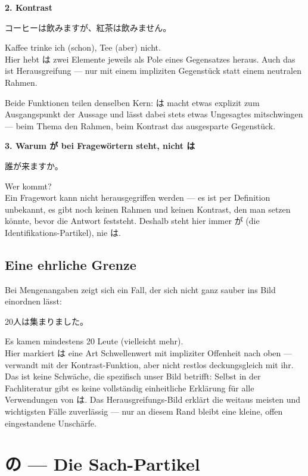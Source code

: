 \documentclass[12pt]{book}
\begin{document}
\textbf{2. Kontrast}
\par\quad コーヒーは飲みますが、紅茶は飲みません。\\
\par\quad Kaffee trinke ich (schon), Tee (aber) nicht.\\

Hier hebt は zwei Elemente jeweils als Pole eines Gegensatzes heraus. Auch das ist Herausgreifung — nur mit einem impliziten Gegenstück statt einem neutralen Rahmen.

Beide Funktionen teilen denselben Kern: は macht etwas explizit zum Ausgangspunkt der Aussage und lässt dabei stets etwas Ungesagtes mitschwingen — beim Thema den Rahmen, beim Kontrast das ausgesparte Gegenstück.

\textbf{3. Warum が bei Fragewörtern steht, nicht は}
\par\quad 誰が来ますか。\\
\par\quad Wer kommt?\\

Ein Fragewort kann nicht herausgegriffen werden — es ist per Definition unbekannt, es gibt noch keinen Rahmen und keinen Kontrast, den man setzen könnte, bevor die Antwort feststeht. Deshalb steht hier immer が (die Identifikations-Partikel), nie は.

\section*{Eine ehrliche Grenze}

Bei Mengenangaben zeigt sich ein Fall, der sich nicht ganz sauber ins Bild einordnen lässt:

\par\quad 20人は集まりました。\\
\par\quad Es kamen mindestens 20 Leute (vielleicht mehr).\\

Hier markiert は eine Art Schwellenwert mit impliziter Offenheit nach oben — verwandt mit der Kontrast-Funktion, aber nicht restlos deckungsgleich mit ihr. Das ist keine Schwäche, die spezifisch unser Bild betrifft: Selbst in der Fachliteratur gibt es keine vollständig einheitliche Erklärung für alle Verwendungen von は. Das Herausgreifungs-Bild erklärt die weitaus meisten und wichtigsten Fälle zuverlässig — nur an diesem Rand bleibt eine kleine, offen eingestandene Unschärfe.


\chapter{の — Die Sach-Partikel}
\end{document}
